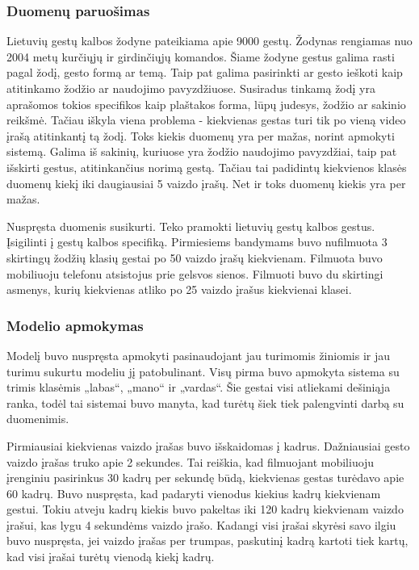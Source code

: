 \documentclass{VUMIFPSbakalaurinis}
\begin{document}
\subsubsection{Duomenų paruošimas}
Lietuvių gestų kalbos žodyne pateikiama apie 9000 gestų. Žodynas rengiamas nuo 2004 metų kurčiųjų ir girdinčiųjų komandos. Šiame žodyne gestus galima rasti pagal žodį, gesto formą ar temą. Taip pat galima pasirinkti ar gesto ieškoti kaip atitinkamo žodžio ar naudojimo pavyzdžiuose. Susiradus tinkamą žodį yra aprašomos tokios specifikos kaip plaštakos forma, lūpų judesys, žodžio ar sakinio reikšmė. Tačiau iškyla viena problema - kiekvienas gestas turi tik po vieną video įrašą atitinkantį tą žodį. Toks kiekis duomenų yra per mažas, norint apmokyti sistemą. Galima iš sakinių, kuriuose yra žodžio naudojimo pavyzdžiai, taip pat išskirti gestus, atitinkančius norimą gestą. Tačiau tai padidintų kiekvienos klasės duomenų kiekį iki daugiausiai 5 vaizdo įrašų. Net ir toks duomenų kiekis yra per mažas.

Nuspręsta duomenis susikurti. Teko pramokti lietuvių gestų kalbos gestus. Įsigilinti į gestų kalbos specifiką. Pirmiesiems bandymams buvo nufilmuota 3 skirtingų žodžių klasių gestai po 50 vaizdo įrašų kiekvienam. Filmuota buvo mobiliuoju telefonu atsistojus prie gelsvos sienos. Filmuoti buvo du skirtingi asmenys, kurių kiekvienas atliko po 25 vaizdo įrašus kiekvienai klasei.

\subsubsection{Modelio apmokymas}

Modelį buvo nuspręsta apmokyti pasinaudojant jau turimomis žiniomis ir jau turimu sukurtu modeliu jį patobulinant. Visų pirma buvo apmokyta sistema su trimis klasėmis „labas“, „mano“ ir „vardas“. Šie gestai visi atliekami dešiniąja ranka, todėl tai sistemai buvo manyta, kad turėtų šiek tiek palengvinti darbą su duomenimis.

Pirmiausiai kiekvienas vaizdo įrašas buvo išskaidomas į kadrus. Dažniausiai gesto vaizdo įrašas truko apie 2 sekundes. Tai reiškia, kad filmuojant mobiliuoju įrenginiu pasirinkus 30 kadrų per sekundę būdą, kiekvienas gestas turėdavo apie 60 kadrų. Buvo nuspręsta, kad padaryti vienodus kiekius kadrų kiekvienam gestui. Tokiu atveju kadrų kiekis buvo pakeltas iki 120 kadrų kiekvienam vaizdo įrašui, kas lygu 4 sekundėms vaizdo įrašo. Kadangi visi įrašai skyrėsi savo ilgiu buvo nuspręsta, jei vaizdo įrašas per trumpas, paskutinį kadrą kartoti tiek kartų, kad visi įrašai turėtų vienodą kiekį kadrų. 
\end{document}
